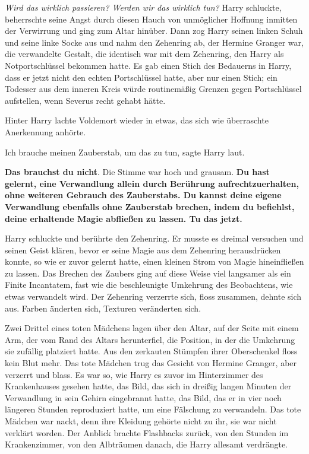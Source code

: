 \emph{Wird das wirklich passieren? Werden wir das wirklich tun?}
Harry schluckte, beherrschte seine Angst durch diesen Hauch von unmöglicher
Hoffnung inmitten der Verwirrung und ging zum Altar hinüber. Dann zog Harry
seinen linken Schuh und seine linke Socke aus und nahm den Zehenring ab, der
Hermine Granger war, die verwandelte Gestalt, die identisch war mit dem
Zehenring, den Harry als Notportschlüssel bekommen hatte. Es gab einen Stich des
Bedauerns in Harry, dass er jetzt nicht den echten Portschlüssel hatte, aber nur
einen Stich; ein Todesser aus dem inneren Kreis würde routinemäßig Grenzen gegen
Portschlüssel aufstellen, wenn Severus recht gehabt hätte.

Hinter Harry lachte Voldemort wieder in etwas, das sich wie überraschte
Anerkennung anhörte.

\glqq{}Ich brauche meinen Zauberstab, um das zu tun\grqq{}, sagte Harry laut.

\glqq{}\textbf{Das brauchst du nicht}.\grqq{} Die Stimme war hoch und grausam. \glqq{}
\textbf{Du hast gelernt, eine Verwandlung allein durch Berührung
aufrechtzuerhalten, ohne weiteren Gebrauch des Zauberstabs. Du kannst deine
eigene Verwandlung ebenfalls ohne Zauberstab brechen, indem du befiehlst, deine
erhaltende Magie abfließen zu lassen. Tu das jetzt.}\grqq{}

Harry schluckte und berührte den Zehenring. Er musste es dreimal versuchen und
seinen Geist klären, bevor er seine Magie aus dem Zehenring herausdrücken
konnte, so wie er zuvor gelernt hatte, einen kleinen Strom von Magie
hineinfließen zu lassen. Das Brechen des Zaubers ging auf diese Weise viel
langsamer als ein Finite Incantatem, fast wie die beschleunigte Umkehrung des
Beobachtens, wie etwas verwandelt wird. Der Zehenring verzerrte sich, floss
zusammen, dehnte sich aus. Farben änderten sich, Texturen veränderten sich.

Zwei Drittel eines toten Mädchens lagen über den Altar, auf der Seite mit einem
Arm, der vom Rand des Altars herunterfiel, die Position, in der die Umkehrung
sie zufällig platziert hatte. Aus den zerkauten Stümpfen ihrer Oberschenkel
floss kein Blut mehr. Das tote Mädchen trug das Gesicht von Hermine Granger,
aber verzerrt und blass. Es war so, wie Harry es zuvor im Hinterzimmer des
Krankenhauses gesehen hatte, das Bild, das sich in dreißig langen Minuten der
Verwandlung in sein Gehirn eingebrannt hatte, das Bild, das er in vier noch
längeren Stunden reproduziert hatte, um eine Fälschung zu verwandeln. Das tote
Mädchen war nackt, denn ihre Kleidung gehörte nicht zu ihr, sie war nicht
verklärt worden. Der Anblick brachte Flashbacks zurück, von den Stunden im
Krankenzimmer, von den Albträumen danach, die Harry allesamt verdrängte.


